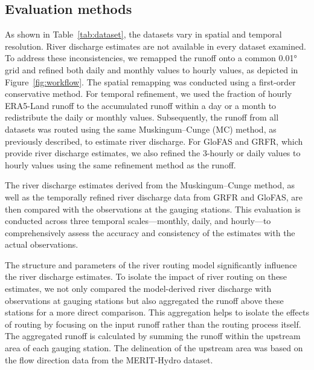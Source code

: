 \documentclass[water,article,submit,pdftex,moreauthors]{Definitions/mdpi}
\begin{document}
\subsection{Evaluation methods}

As shown in Table~\ref{tab:dataset}, the datasets vary in spatial and temporal resolution. River discharge estimates are not available in every dataset examined. To address these inconsistencies, we remapped the runoff onto a common 0.01° grid and refined both daily and monthly values to hourly values, as depicted in Figure~\ref{fig:workflow}. The spatial remapping was conducted using a first-order conservative method. For temporal refinement, we used the fraction of hourly ERA5-Land runoff to the accumulated runoff within a day or a month to redistribute the daily or monthly values. Subsequently, the runoff from all datasets was routed using the same Muskingum--Cunge (MC) method, as previously described, to estimate river discharge. For GloFAS and GRFR, which provide river discharge estimates, we also refined the 3-hourly or daily values to hourly values using the same refinement method as the runoff.

The river discharge estimates derived from the Muskingum--Cunge method, as well as the temporally refined river discharge data from GRFR and GloFAS, are then compared with the observations at the gauging stations. This evaluation is conducted across three temporal scales—monthly, daily, and hourly—to comprehensively assess the accuracy and consistency of the estimates with the actual observations.

The structure and parameters of the river routing model significantly influence the river discharge estimates. To isolate the impact of river routing on these estimates, we not only compared the model-derived river discharge with observations at gauging stations but also aggregated the runoff above these stations for a more direct comparison. This aggregation helps to isolate the effects of routing by focusing on the input runoff rather than the routing process itself. The aggregated runoff is calculated by summing the runoff within the upstream area of each gauging station. The delineation of the upstream area was based on the flow direction data from the MERIT-Hydro dataset.
\end{document}
